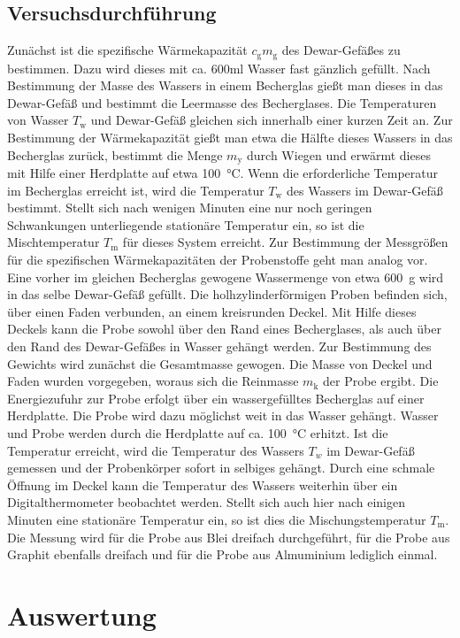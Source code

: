\documentclass[
  bibliography=totoc,     %
  captions=tableheading,  %
  titlepage=firstiscover, %
]{scrartcl}
\begin{document}
\subsection{Versuchsdurchführung}
Zunächst ist die spezifische Wärmekapazität $c_{\mathup{g}}m_{\mathup{g}}$ des
Dewar-Gefäßes zu bestimmen.
Dazu wird dieses mit ca. 600ml Wasser fast gänzlich gefüllt. Nach Bestimmung der
Masse des Wassers in einem Becherglas gießt man dieses in das Dewar-Gefäß und
bestimmt die Leermasse des Becherglases. Die Temperaturen von Wasser
$T_{\mathup{w}}$ und Dewar-Gefäß gleichen sich innerhalb einer kurzen Zeit an.
Zur Bestimmung der Wärmekapazität gießt man etwa die Hälfte dieses Wassers in
das Becherglas zurück, bestimmt die Menge $m_{\mathup{y}}$ durch Wiegen und
erwärmt dieses mit Hilfe einer Herdplatte auf etwa \SI{100}{\celsius}.
Wenn die erforderliche Temperatur im Becherglas erreicht ist, wird die
Temperatur $T_{\mathup{w}}$ des Wassers im Dewar-Gefäß bestimmt. Stellt sich nach
wenigen Minuten eine nur noch geringen Schwankungen unterliegende stationäre
Temperatur ein, so ist die Mischtemperatur $T_{\mathup{m}}$ für dieses System
erreicht.
Zur Bestimmung der Messgrößen für die spezifischen Wärmekapazitäten der
Probenstoffe geht man analog vor. Eine vorher im gleichen Becherglas gewogene
Wassermenge von etwa \SI{600}{\gram} wird in das selbe Dewar-Gefäß gefüllt. Die
holhzylinderförmigen Proben befinden sich, über einen Faden verbunden, an einem
kreisrunden Deckel. Mit Hilfe dieses Deckels kann die Probe sowohl über den Rand
eines Becherglases, als auch über den Rand des Dewar-Gefäßes in Wasser gehängt
werden. Zur Bestimmung des Gewichts wird zunächst die Gesamtmasse gewogen. Die
Masse von Deckel und Faden wurden vorgegeben, woraus sich die Reinmasse
$m_{\mathup{k}}$ der Probe ergibt. Die Energiezufuhr zur Probe erfolgt über ein
wassergefülltes Becherglas auf einer Herdplatte. Die Probe wird dazu möglichst
weit in das Wasser gehängt. Wasser und Probe werden durch die Herdplatte auf ca.
\SI{100}{\celsius} erhitzt. Ist die Temperatur erreicht, wird die Temperatur des
Wassers $T_w$ im Dewar-Gefäß gemessen und der Probenkörper sofort in selbiges
gehängt. Durch eine schmale Öffnung im Deckel kann die Temperatur des Wassers
weiterhin über ein Digitalthermometer beobachtet werden. Stellt sich auch hier
nach einigen Minuten eine stationäre Temperatur ein, so ist dies die
Mischungstemperatur $T_{\mathup{m}}$. Die Messung wird für die Probe aus Blei
dreifach durchgeführt, für die Probe aus Graphit ebenfalls dreifach und für die
Probe aus Almuminium lediglich einmal.
\section{Auswertung}
\label{sec:auswertung}
\end{document}
